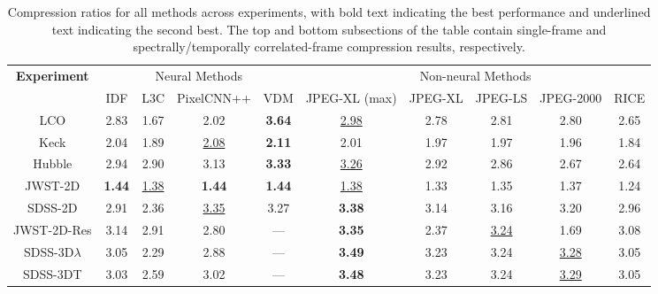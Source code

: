 \begin{table}[t]
  \centering
  \scriptsize
  \begin{tabular}{@{}c|cccc|ccccc@{}}
    \toprule
    \multirow{2}{*}{\textbf{Experiment}} & \multicolumn{4}{c|}{Neural Methods} & \multicolumn{5}{c}{Non-neural Methods}\\
    \cmidrule(lr){2-10}
    & IDF & L3C & PixelCNN++ & VDM & JPEG-XL (max) & JPEG-XL & JPEG-LS & JPEG-2000 & RICE\\
    \midrule
    LCO & 2.83 & 1.67 & 2.02 & \textbf{3.64} & \underline{2.98} & 2.78 & 2.81 & 2.80 & 2.65 \\
    \midrule
    Keck & 2.04 & 1.89 & \underline{2.08} & \textbf{2.11} & 2.01 & 1.97 & 1.97 & 1.96 & 1.84 \\
    \midrule
    Hubble & 2.94 & 2.90 & 3.13 & \textbf{3.33} & \underline{3.26} & 2.92 & 2.86 & 2.67 & 2.64 \\
    \midrule
    JWST-2D & \textbf{1.44} & \underline{1.38} & \textbf{1.44} & \textbf{1.44} & \underline{1.38} & 1.33 & 1.35 & 1.37 & 1.24 \\
    \midrule
    SDSS-2D & 2.91 & 2.36 & \underline{3.35} & 3.27 & \textbf{3.38} & 3.14 & 3.16 & 3.20 & 2.96 \\
    \bottomrule
    \toprule
    JWST-2D-Res & 3.14 & 2.91 & 2.80 & --- & \textbf{3.35} & 2.37 & \underline{3.24} & 1.69 & 3.08\\
    \midrule
    SDSS-3D$\lambda$ & 3.05 & 2.29 & 2.88 & --- & \textbf{3.49} & 3.23 & 3.24 & \underline{3.28} & 3.05 \\
    \midrule
    SDSS-3DT & 3.03 & 2.59 & 3.02 & --- & \textbf{3.48} & 3.23 & 3.24 & \underline{3.29} & 3.05 \\
    \bottomrule
  \end{tabular}
  
  \caption{\vspace{0.05cm}Compression ratios for all methods across experiments, with bold text indicating the best performance and underlined text indicating the second best.
  The top and bottom subsections of the table contain single-frame and spectrally/temporally correlated-frame compression results, respectively. %
  }
  \label{tab:compression_ratio}
\end{table}

